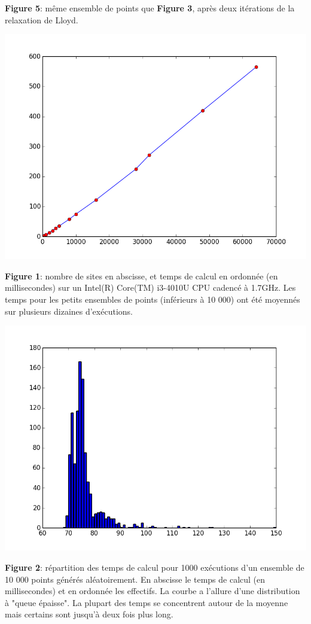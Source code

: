 \documentclass[a4paper, 10pt]{article}
\begin{document}
\begin{center}
\textbf{Figure 5}: même ensemble de points que \textbf{Figure 3}, après deux itérations de la relaxation de Lloyd. 
  
\newpage
\includegraphics[scale=0.5]{PerformancesMilisecondes.png} 
  
\textbf{Figure 1}: nombre de sites en abscisse, et temps de calcul en ordonnée (en millisecondes) sur un Intel(R) Core(TM) i3-4010U CPU cadencé à 1.7GHz. Les temps pour les petits ensembles de points (inférieurs à 10 000) ont été moyennés sur plusieurs dizaines d'exécutions.  
  
\includegraphics[scale=0.5]{PerformancesGaussienne.png}  
  
\textbf{Figure 2}: répartition des temps de calcul pour 1000 exécutions d'un ensemble de 10 000 points générés aléatoirement. En abscisse le temps de calcul (en millisecondes) et en ordonnée les effectifs. La courbe a l'allure d'une distribution à "queue épaisse". La plupart des temps se concentrent autour de la moyenne mais certains sont jusqu'à deux fois plus long.
  

\end{center}
\end{document}
